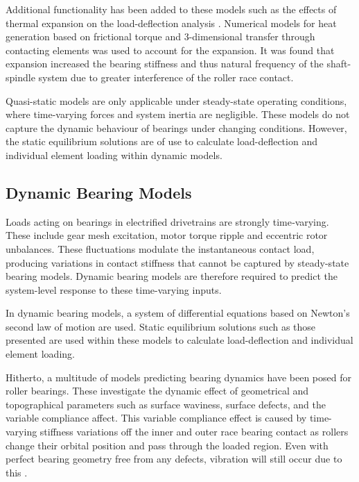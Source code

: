 Additional functionality has been added to these models such as the effects of thermal expansion on the load-deflection analysis \cite{Jorgensen1997}. Numerical models for heat generation based on frictional torque and 3-dimensional transfer through contacting elements was used to account for the expansion. It was found that expansion increased the bearing stiffness and thus natural frequency of the shaft-spindle system due to greater interference of the roller race contact.

Quasi-static models are only applicable under steady-state operating conditions, where time-varying forces and system inertia are negligible. These models do not capture the dynamic behaviour of bearings under changing conditions. However, the static equilibrium solutions \cite{Andreason1973} \cite{Liu1976} \cite{DeMul1989_1} are of use to calculate load-deflection and individual element loading within dynamic models.

\subsection{Dynamic Bearing Models}
Loads acting on bearings in electrified drivetrains are strongly time‑varying. These include gear mesh excitation, motor torque ripple and eccentric rotor unbalances. These fluctuations modulate the instantaneous contact load, producing variations in contact stiffness that cannot be captured by steady-state bearing models. Dynamic bearing models are therefore required to predict the system-level response to these time-varying inputs.

In dynamic bearing models, a system of differential equations based on Newton’s second law of motion are used. Static equilibrium solutions such as those presented are used within these models to calculate load-deflection and individual element loading.

Hitherto, a multitude of models predicting bearing dynamics have been posed for roller bearings. These investigate the dynamic effect of geometrical and topographical parameters such as surface waviness, surface defects, and the variable compliance affect. This variable compliance effect is caused by time-varying stiffness variations off the inner and outer race bearing contact as rollers change their orbital position and pass through the loaded region. Even with perfect bearing geometry free from any defects, vibration will still occur due to this \cite{Sopanen2003_1}.
  
